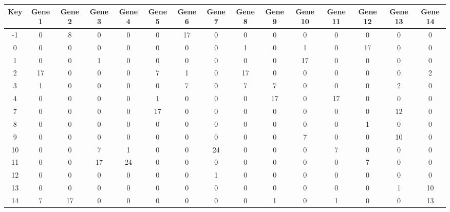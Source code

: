 \begin{tabular}{|c|c|c|c|c|c|c|c|c|c|c|c|c|c|c|}
\hline
Key & Gene 1 & Gene 2 & Gene 3 & Gene 4 & Gene 5 & Gene 6 & Gene 7 & Gene 8 & Gene 9 & Gene 10 & Gene 11 & Gene 12 & Gene 13 & Gene 14 \\
\hline
-1 & 0 & 8 & 0 & 0 & 0 & 17 & 0 & 0 & 0 & 0 & 0 & 0 & 0 & 0 \\
0 & 0 & 0 & 0 & 0 & 0 & 0 & 0 & 1 & 0 & 1 & 0 & 17 & 0 & 0 \\
1 & 0 & 0 & 1 & 0 & 0 & 0 & 0 & 0 & 0 & 17 & 0 & 0 & 0 & 0 \\
2 & 17 & 0 & 0 & 0 & 7 & 1 & 0 & 17 & 0 & 0 & 0 & 0 & 0 & 2 \\
3 & 1 & 0 & 0 & 0 & 0 & 7 & 0 & 7 & 7 & 0 & 0 & 0 & 2 & 0 \\
4 & 0 & 0 & 0 & 0 & 1 & 0 & 0 & 0 & 17 & 0 & 17 & 0 & 0 & 0 \\
7 & 0 & 0 & 0 & 0 & 17 & 0 & 0 & 0 & 0 & 0 & 0 & 0 & 12 & 0 \\
8 & 0 & 0 & 0 & 0 & 0 & 0 & 0 & 0 & 0 & 0 & 0 & 1 & 0 & 0 \\
9 & 0 & 0 & 0 & 0 & 0 & 0 & 0 & 0 & 0 & 7 & 0 & 0 & 10 & 0 \\
10 & 0 & 0 & 7 & 1 & 0 & 0 & 24 & 0 & 0 & 0 & 7 & 0 & 0 & 0 \\
11 & 0 & 0 & 17 & 24 & 0 & 0 & 0 & 0 & 0 & 0 & 0 & 7 & 0 & 0 \\
12 & 0 & 0 & 0 & 0 & 0 & 0 & 1 & 0 & 0 & 0 & 0 & 0 & 0 & 0 \\
13 & 0 & 0 & 0 & 0 & 0 & 0 & 0 & 0 & 0 & 0 & 0 & 0 & 1 & 10 \\
14 & 7 & 17 & 0 & 0 & 0 & 0 & 0 & 0 & 1 & 0 & 1 & 0 & 0 & 13 \\
\hline
\end{tabular}